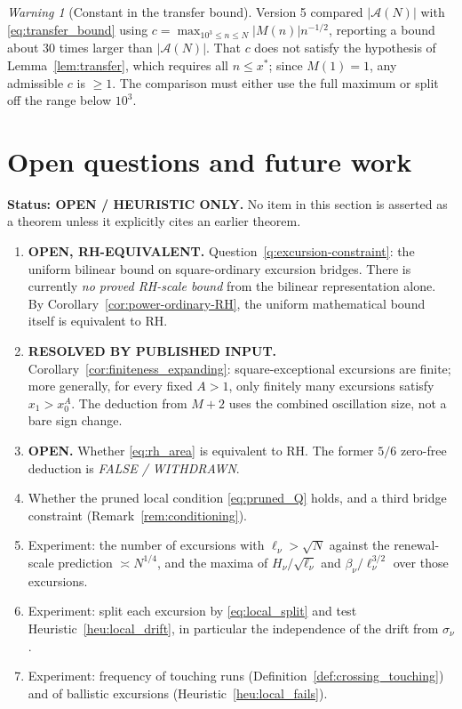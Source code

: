\documentclass[11pt]{amsart}
\numberwithin{equation}{section}
\theoremstyle{plain}
\theoremstyle{definition}
\theoremstyle{remark}
\newtheorem{warning}[theorem]{Warning}
\newcommand{\Anet}{\mathcal{A}}
\begin{document}
\begin{warning}[Constant in the transfer bound]
\label{warn:census_c}
Version 5 compared $|\Anet(N)|$ with \eqref{eq:transfer_bound} using
$c=\max_{10^3\le n\le N}|M(n)|n^{-1/2}$, reporting a bound about $30$ times
larger than $|\Anet(N)|$. That $c$ does not satisfy the hypothesis of
Lemma~\ref{lem:transfer}, which requires all $n\le x^*$; since $M(1)=1$, any
admissible $c$ is $\ge1$. The comparison must either use the full maximum or
split off the range below $10^3$.
\end{warning}

\section{Open questions and future work}
\label{sec:open_questions}

\noindent\textbf{Status: OPEN / HEURISTIC ONLY.} No item in this section
is asserted as a theorem unless it explicitly cites an earlier theorem.

\begin{enumerate}[label=\textup{(\arabic*)}]
\item \textbf{OPEN, RH-EQUIVALENT.} Question~\ref{q:excursion-constraint}:
the uniform bilinear bound on square-ordinary excursion bridges. There is
currently \emph{no proved RH-scale bound} from the bilinear representation
alone. By Corollary~\ref{cor:power-ordinary-RH}, the uniform mathematical bound
itself is equivalent to RH.
\item \textbf{RESOLVED BY PUBLISHED INPUT.}
Corollary~\ref{cor:finiteness_expanding}: square-exceptional excursions are
finite; more generally, for every fixed $A>1$, only finitely many excursions
satisfy $x_1>x_0^A$. The deduction from $M+2$ uses the combined oscillation
size, not a bare sign change.
\item \textbf{OPEN.} Whether \eqref{eq:rh_area} is equivalent to RH.
The former $5/6$ zero-free deduction is \emph{FALSE / WITHDRAWN}.
\item Whether the pruned local condition \eqref{eq:pruned_Q} holds, and a
third bridge constraint (Remark~\ref{rem:conditioning}).
\item Experiment: the number of excursions with $\ell_\nu>\sqrt N$ against the
renewal-scale prediction $\asymp N^{1/4}$, and the maxima of $H_\nu/\sqrt{\ell_\nu}$ and
$\beta_\nu/\ell_\nu^{3/2}$ over those excursions.
\item Experiment: split each excursion by \eqref{eq:local_split} and test
Heuristic~\ref{heu:local_drift}, in particular the independence of the drift
from $\sigma_\nu$.
\item Experiment: frequency of touching runs (Definition~\ref{def:crossing_touching})
and of ballistic excursions (Heuristic~\ref{heu:local_fails}).
\end{enumerate}
\end{document}
